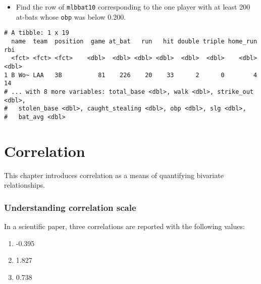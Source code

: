 \documentclass[
]{book}
\newenvironment{Shaded}{\begin{snugshade}}{\end{snugshade}}
\newcommand{\CommentTok}[1]{\textcolor[rgb]{0.56,0.35,0.01}{\textit{#1}}}
\newcommand{\DecValTok}[1]{\textcolor[rgb]{0.00,0.00,0.81}{#1}}
\newcommand{\FloatTok}[1]{\textcolor[rgb]{0.00,0.00,0.81}{#1}}
\newcommand{\KeywordTok}[1]{\textcolor[rgb]{0.13,0.29,0.53}{\textbf{#1}}}
\newcommand{\NormalTok}[1]{#1}
\newcommand{\OperatorTok}[1]{\textcolor[rgb]{0.81,0.36,0.00}{\textbf{#1}}}
\newcommand{\StringTok}[1]{\textcolor[rgb]{0.31,0.60,0.02}{#1}}
\providecommand{\tightlist}{%
  \setlength{\itemsep}{0pt}\setlength{\parskip}{0pt}}
\begin{document}
\begin{itemize}
\tightlist
\item
  Find the row of \texttt{mlbbat10} corresponding to the one player with at least 200 at-bats whose \texttt{obp} was below 0.200.
\end{itemize}

\begin{Shaded}
\end{Shaded}

\begin{verbatim}
# A tibble: 1 x 19
  name  team  position  game at_bat   run   hit double triple home_run   rbi
  <fct> <fct> <fct>    <dbl>  <dbl> <dbl> <dbl>  <dbl>  <dbl>    <dbl> <dbl>
1 B Wo~ LAA   3B          81    226    20    33      2      0        4    14
# ... with 8 more variables: total_base <dbl>, walk <dbl>, strike_out <dbl>,
#   stolen_base <dbl>, caught_stealing <dbl>, obp <dbl>, slg <dbl>,
#   bat_avg <dbl>
\end{verbatim}

\hypertarget{correlation}{%
\chapter{Correlation}\label{correlation}}

This chapter introduces correlation as a means of quantifying bivariate relationships.

\hypertarget{understanding-correlation-scale}{%
\subsection*{Understanding correlation scale}\label{understanding-correlation-scale}}

In a scientific paper, three correlations are reported with the following values:

\begin{enumerate}
\def\labelenumi{\arabic{enumi}.}
\tightlist
\item
  -0.395
\item
  1.827
\item
  0.738
\end{enumerate}
\end{document}
